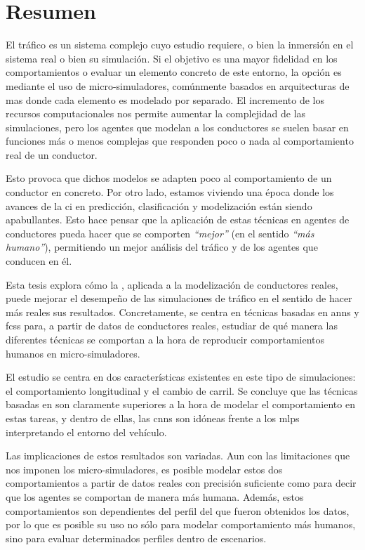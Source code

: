 \cleardoublepage
\thispagestyle{empty}
\chapter*{Resumen}
\begin{fullwidth}
	El tráfico es un sistema complejo cuyo estudio requiere, o bien la inmersión en el sistema real o bien su simulación. Si el objetivo es una mayor fidelidad en los comportamientos o evaluar un elemento concreto de este entorno, la opción es mediante el uso de micro-simuladores, comúnmente basados en arquitecturas de \ac{mas} donde cada elemento es modelado por separado. El incremento de los recursos computacionales nos permite aumentar la complejidad de las simulaciones, pero los agentes que modelan a los conductores se suelen basar en funciones más o menos complejas que responden poco o nada al comportamiento real de un conductor.
	
	Esto provoca que dichos modelos se adapten poco al comportamiento de un conductor en concreto. Por otro lado, estamos viviendo una época donde los avances de la \ac{ci} en predicción, clasificación y modelización están siendo apabullantes. Esto hace pensar que la aplicación de estas técnicas en agentes de conductores pueda hacer que se comporten \textit{\enquote{mejor}} (en el sentido \textit{\enquote{más humano}}), permitiendo un mejor análisis del tráfico y de los agentes que conducen en él.
	
	Esta tesis explora cómo la , aplicada a la modelización de conductores reales, puede mejorar el desempeño de las simulaciones de tráfico en el sentido de hacer más reales sus resultados. Concretamente, se centra en técnicas basadas en \acp{ann} y \acp{fcs} para, a partir de datos de conductores reales, estudiar de qué manera las diferentes técnicas se comportan a la hora de reproducir comportamientos humanos en micro-simuladores.
	
	El estudio se centra en dos características existentes en este tipo de simulaciones: el comportamiento longitudinal y el cambio de carril. Se concluye que las técnicas basadas en  son claramente superiores a la hora de modelar el comportamiento en estas tareas, y dentro de ellas, las \acp{cnn} son idóneas frente a los \acp{mlp} interpretando el entorno del vehículo.
	
	Las implicaciones de estos resultados son variadas. Aun con las limitaciones que nos imponen los micro-simuladores, es posible modelar estos dos comportamientos a partir de datos reales con precisión suficiente como para decir que los agentes se comportan de manera más humana. Además, estos comportamientos son dependientes del perfil del que fueron obtenidos los datos, por lo que es posible su uso no sólo para modelar comportamiento más humanos, sino para evaluar determinados perfiles dentro de escenarios.
	

\end{fullwidth}
